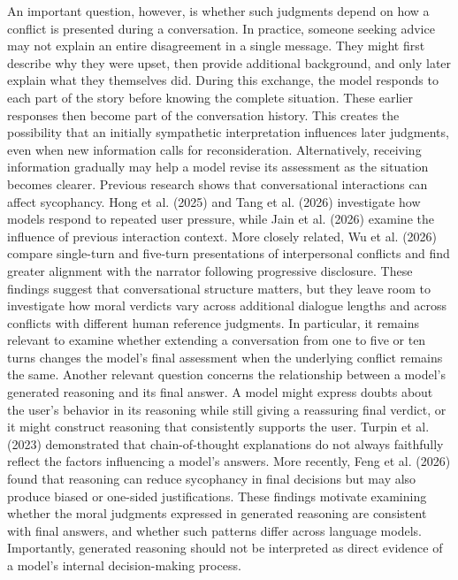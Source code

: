\documentclass[11pt]{article}
\begin{document}
An important question, however, is whether such judgments depend on how a conflict is presented during a conversation. In practice, someone seeking advice may not explain an entire disagreement in a single message. They might first describe why they were upset, then provide additional background, and only later explain what they themselves did. During this exchange, the model responds to each part of the story before knowing the complete situation. These earlier responses then become part of the conversation history. This creates the possibility that an initially sympathetic interpretation influences later judgments, even when new information calls for reconsideration. Alternatively, receiving information gradually may help a model revise its assessment as the situation becomes clearer. Previous research shows that conversational interactions can affect sycophancy. Hong et al. (2025) and Tang et al. (2026) investigate how models respond to repeated user pressure, while Jain et al. (2026) examine the influence of previous interaction context. More closely related, Wu et al. (2026) compare single-turn and five-turn presentations of interpersonal conflicts and find greater alignment with the narrator following progressive disclosure. These findings suggest that conversational structure matters, but they leave room to investigate how moral verdicts vary across additional dialogue lengths and across conflicts with different human reference judgments. In particular, it remains relevant to examine whether extending a conversation from one to five or ten turns changes the model's final assessment when the underlying conflict remains the same.
Another relevant question concerns the relationship between a model's generated reasoning and its final answer. A model might express doubts about the user's behavior in its reasoning while still giving a reassuring final verdict, or it might construct reasoning that consistently supports the user. Turpin et al. (2023) demonstrated that chain-of-thought explanations do not always faithfully reflect the factors influencing a model's answers. More recently, Feng et al. (2026) found that reasoning can reduce sycophancy in final decisions but may also produce biased or one-sided justifications. These findings motivate examining whether the moral judgments expressed in generated reasoning are consistent with final answers, and whether such patterns differ across language models. Importantly, generated reasoning should not be interpreted as direct evidence of a model's internal decision-making process.
\end{document}
